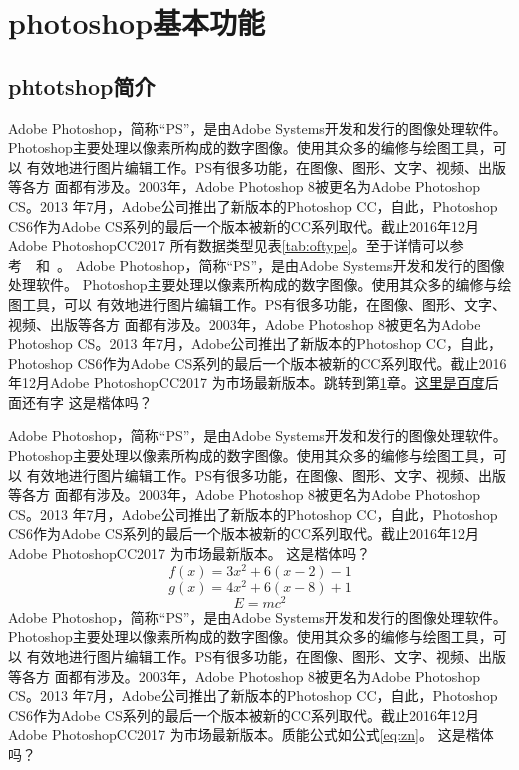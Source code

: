 
\mylineskip
\chapter{photoshop基本功能}\label{chaper:ch1}
\section{phtotshop简介}
Adobe Photoshop，简称“PS”，是由Adobe Systems开发和发行的图像处理软件。
Photoshop主要处理以像素所构成的数字图像。使用其众多的编修与绘图工具，可以
有效地进行图片编辑工作。PS有很多功能，在图像、图形、文字、视频、出版等各方
面都有涉及。2003年，Adobe Photoshop 8被更名为Adobe Photoshop CS。2013
年7月，Adobe公司推出了新版本的Photoshop CC，自此，Photoshop CS6作为Adobe
 CS系列的最后一个版本被新的CC系列取代。截止2016年12月Adobe PhotoshopCC2017
 所有数据类型见表\ref{tab:oftype}。至于详情可以参考~\cite{gzp}~和~\cite{nue}。
\oftypetable
 Adobe Photoshop，简称“PS”，是由Adobe Systems开发和发行的图像处理软件。
 Photoshop主要处理以像素所构成的数字图像。使用其众多的编修与绘图工具，可以
 有效地进行图片编辑工作。PS有很多功能，在图像、图形、文字、视频、出版等各方
 面都有涉及。2003年，Adobe Photoshop 8被更名为Adobe Photoshop CS。2013
 年7月，Adobe公司推出了新版本的Photoshop CC，自此，Photoshop CS6作为Adobe
 CS系列的最后一个版本被新的CC系列取代。截止2016年12月Adobe PhotoshopCC2017
 为市场最新版本。跳转到第\ref{chaper:ch1}章。\href{http://www.baidu.com}{这里是百度}后面还有字
 {\kaishu 这是楷体吗？}
 
  Adobe Photoshop，简称“PS”，是由Adobe Systems开发和发行的图像处理软件。
 Photoshop主要处理以像素所构成的数字图像。使用其众多的编修与绘图工具，可以
 有效地进行图片编辑工作。PS有很多功能，在图像、图形、文字、视频、出版等各方
 面都有涉及。2003年，Adobe Photoshop 8被更名为Adobe Photoshop CS。2013
 年7月，Adobe公司推出了新版本的Photoshop CC，自此，Photoshop CS6作为Adobe
 CS系列的最后一个版本被新的CC系列取代。截止2016年12月Adobe PhotoshopCC2017
 为市场最新版本。
 {\kaishu 这是楷体吗？}
\setlength{\abovedisplayskip}{0pt}
\setlength{\belowdisplayskip}{0pt}
 \begin{equation}\label{eq:fx}
 f(x)=3x^{2}+6(x-2)-1
 \end{equation}
 \begin{equation}\label{eq:gx}
g(x)=4x^{2}+6(x-8)+1
\end{equation}
 \begin{equation}\label{eq:zn}
E=mc^2
\end{equation}
  Adobe Photoshop，简称“PS”，是由Adobe Systems开发和发行的图像处理软件。
 Photoshop主要处理以像素所构成的数字图像。使用其众多的编修与绘图工具，可以
 有效地进行图片编辑工作。PS有很多功能，在图像、图形、文字、视频、出版等各方
 面都有涉及。2003年，Adobe Photoshop 8被更名为Adobe Photoshop CS。2013
 年7月，Adobe公司推出了新版本的Photoshop CC，自此，Photoshop CS6作为Adobe
 CS系列的最后一个版本被新的CC系列取代。截止2016年12月Adobe PhotoshopCC2017
 为市场最新版本。质能公式如公式\eqref{eq:zn}。
 {\kaishu 这是楷体吗？}
 
